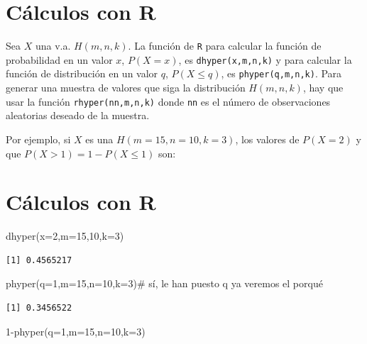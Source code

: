 \documentclass[
  letterpaper,
  DIV=11,
  numbers=noendperiod]{scrreprt}
\newenvironment{Shaded}{\begin{snugshade}}{\end{snugshade}}
\newcommand{\AttributeTok}[1]{\textcolor[rgb]{0.40,0.45,0.13}{#1}}
\newcommand{\CommentTok}[1]{\textcolor[rgb]{0.37,0.37,0.37}{#1}}
\newcommand{\DecValTok}[1]{\textcolor[rgb]{0.68,0.00,0.00}{#1}}
\newcommand{\FunctionTok}[1]{\textcolor[rgb]{0.28,0.35,0.67}{#1}}
\newcommand{\NormalTok}[1]{\textcolor[rgb]{0.00,0.23,0.31}{#1}}
\newcommand{\SpecialCharTok}[1]{\textcolor[rgb]{0.37,0.37,0.37}{#1}}
\begin{document}
\section{Cálculos con R}\label{cuxe1lculos-con-r-9}

Sea \(X\) una v.a. \(H(m,n,k)\). La función de \texttt{R} para calcular
la función de probabilidad en un valor \(x\), \(P(X=x)\), es
\texttt{dhyper(x,m,n,k)} y para calcular la función de distribución en
un valor \(q\), \(P(X\leq q)\), es \texttt{phyper(q,m,n,k)}. Para
generar una muestra de valores que siga la distribución \(H(m,n,k)\),
hay que usar la función \texttt{rhyper(nn,m,n,k)} donde \texttt{nn} es
el número de observaciones aleatorias deseado de la muestra.

Por ejemplo, si \(X\) es una \(H(m=15,n=10,k=3)\), los valores de
\(P(X=2)\) y que \(P(X>1)=1-P(X\leq 1)\) son:

\section{Cálculos con R}\label{cuxe1lculos-con-r-10}

\begin{Shaded}
\begin{Highlighting}[]
\FunctionTok{dhyper}\NormalTok{(}\AttributeTok{x=}\DecValTok{2}\NormalTok{,}\AttributeTok{m=}\DecValTok{15}\NormalTok{,}\DecValTok{10}\NormalTok{,}\AttributeTok{k=}\DecValTok{3}\NormalTok{)}
\end{Highlighting}
\end{Shaded}

\begin{verbatim}
[1] 0.4565217
\end{verbatim}

\begin{Shaded}
\begin{Highlighting}[]
\FunctionTok{phyper}\NormalTok{(}\AttributeTok{q=}\DecValTok{1}\NormalTok{,}\AttributeTok{m=}\DecValTok{15}\NormalTok{,}\AttributeTok{n=}\DecValTok{10}\NormalTok{,}\AttributeTok{k=}\DecValTok{3}\NormalTok{)}\CommentTok{\# sí, le han puesto q ya veremos el porqué}
\end{Highlighting}
\end{Shaded}

\begin{verbatim}
[1] 0.3456522
\end{verbatim}

\begin{Shaded}
\begin{Highlighting}[]
\DecValTok{1}\SpecialCharTok{{-}}\FunctionTok{phyper}\NormalTok{(}\AttributeTok{q=}\DecValTok{1}\NormalTok{,}\AttributeTok{m=}\DecValTok{15}\NormalTok{,}\AttributeTok{n=}\DecValTok{10}\NormalTok{,}\AttributeTok{k=}\DecValTok{3}\NormalTok{)}
\end{Highlighting}
\end{Shaded}
\end{document}
